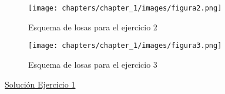 \begin{enumerate}
\begin{figure}[H]
\begin{center}
     \texttt{[image: chapters/chapter\_1/images/figura2.png]}
\end{center}
\caption{Esquema de losas para el ejercicio 2}
\end{figure}

\begin{figure}[H]
\begin{center}
     \texttt{[image: chapters/chapter\_1/images/figura3.png]}
\end{center}
\caption{Esquema de losas para el ejercicio 3}
\end{figure}

\end{enumerate}


\newpage
\begin{center}
\underline{\large{Solución Ejercicio 1}}
\end{center}

